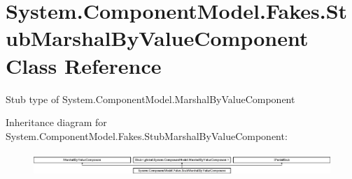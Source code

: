 \hypertarget{class_system_1_1_component_model_1_1_fakes_1_1_stub_marshal_by_value_component}{\section{System.\-Component\-Model.\-Fakes.\-Stub\-Marshal\-By\-Value\-Component Class Reference}
\label{class_system_1_1_component_model_1_1_fakes_1_1_stub_marshal_by_value_component}
}


Stub type of System.\-Component\-Model.\-Marshal\-By\-Value\-Component 


Inheritance diagram for System.\-Component\-Model.\-Fakes.\-Stub\-Marshal\-By\-Value\-Component\-:\begin{figure}[H]
\begin{center}
\leavevmode
\includegraphics[height=0.903955cm]{class_system_1_1_component_model_1_1_fakes_1_1_stub_marshal_by_value_component}
\end{center}
\end{figure}
